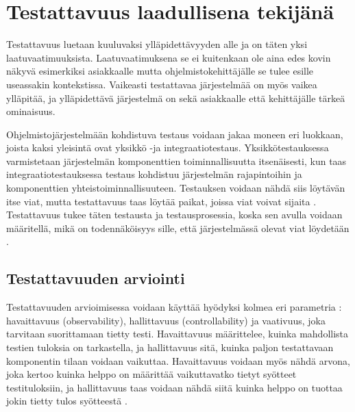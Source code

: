 \documentclass[finnish]{tktltiki2}
\theoremstyle{definition}
\theoremstyle{remark}
\begin{document}
\section{Testattavuus laadullisena tekijänä}
Testattavuus luetaan kuuluvaksi ylläpidettävyyden alle \citep{ISO/IEC25010:2011} ja on täten yksi laatuvaatimuuksista. Laatuvaatimuksena se ei kuitenkaan ole aina edes kovin näkyvä esimerkiksi asiakkaalle mutta ohjelmistokehittäjälle se tulee esille useassakin kontekstissa. Vaikeasti testattavaa järjestelmää on myös vaikea ylläpitää, ja ylläpidettävä järjestelmä on sekä asiakkaalle että kehittäjälle tärkeä ominaisuus.

Ohjelmistojärjestelmään kohdistuva testaus voidaan jakaa moneen eri luokkaan, joista kaksi yleisintä ovat yksikkö -ja integraatiotestaus. Yksikkötestauksessa varmistetaan järjestelmän komponenttien toiminnallisuutta itsenäisesti, kun taas integraatiotestauksessa testaus kohdistuu järjestelmän rajapintoihin ja komponenttien yhteistoiminnallisuuteen. Testauksen voidaan nähdä siis löytävän itse viat, mutta testattavuus taas löytää paikat, joissa viat voivat sijaita \citep[s. 19]{Voas:1995:STN:624607.625469}. Testattavuus tukee täten testausta ja testausprosessia, koska sen avulla voidaan määritellä, mikä on todennäköisyys sille, että järjestelmässä olevat viat löydetään \citep[s. 114]{voas_improving_1992}. 


\subsection{Testattavuuden arviointi} \label{contro_and_observ}

Testattavuuden arvioimisessa voidaan käyttää hyödyksi kolmea eri parametria \citep[s. 2]{baudry_measuring_2003}: havaittavuus (observability), hallittavuus (controllability) ja vaativuus, joka tarvitaan suorittamaan tietty testi. Havaittavuus määrittelee, kuinka mahdollista testien tuloksia on tarkastella, ja hallittavuus sitä, kuinka paljon testattavaan komponentin tilaan voidaan vaikuttaa. Havaittavuus voidaan myös nähdä arvona, joka kertoo kuinka helppo on määrittää vaikuttavatko tietyt syötteet testituloksiin, ja hallittavuus taas voidaan nähdä siitä kuinka helppo on tuottaa jokin tietty tulos syötteestä \citep[s. 554]{Freedman:1991:TSC:126218.126229}. 

\end{document}
